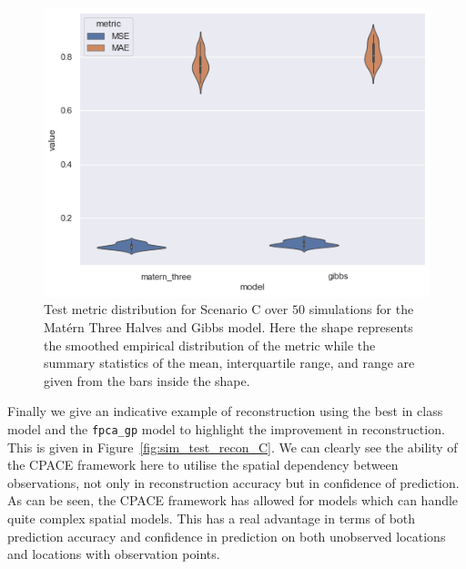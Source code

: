 \begin{figure}
	\centering
	\includegraphics[width=\textwidth]{test_met_C}
	\caption[Test metric distribution for Scenario C over $50$ simulations for the Mat\'ern Three Halves and Gibbs model.]{Test metric distribution for Scenario C over $50$ simulations for the Mat\'ern Three Halves and Gibbs model.  Here the shape represents the smoothed empirical distribution of the metric while the summary statistics of the mean, interquartile range, and range are given from the bars inside the shape.}
	\label{fig:test_met_C}
\end{figure}

Finally we give an indicative example of reconstruction using the best in class model and the \verb*|fpca_gp| model to highlight the improvement in reconstruction. 
This is given in Figure~\ref{fig:sim_test_recon_C}. 
We can clearly see the ability of the CPACE framework here to utilise the spatial dependency between observations, not only in reconstruction accuracy but in confidence of prediction.
As can be seen, the CPACE framework has allowed for models which can handle quite complex spatial models. 
This has a real advantage in terms of both prediction accuracy and confidence in prediction on both unobserved locations and locations with observation points. 

